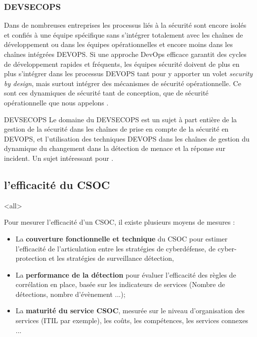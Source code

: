 

\subsubsection{DEVSECOPS}

Dans de nombreuses entreprises les processus liés à la sécurité sont encore isolés et confiés à une équipe spécifique sans s'intégrer totalement avec les chaînes de développement ou dans les équipes opérationnelles et encore moins dans les chaînes intégrées DEVOPS. 
 Si une approche DevOps efficace garantit des cycles de développement rapides et fréquents, les équipes sécurité doivent de plus en plus s'intégrer dans les processus DEVOPS tant pour y apporter un volet \textit{security by design}, mais surtout intégrer des mécanismes de sécurité opérationnelle.
 Ce sont ces dynamiques de sécurité tant de conception, que de sécurité opérationnelle que nous appelons .
 
\utocomplete

 
\begin{techworkbox}{DEVSECOPS}
Le domaine du DEVSECOPS est un sujet à part entière de la gestion de la sécurité dans les chaînes de prise en compte de la sécurité  en DEVOPS, et l'utilisation des techniques DEVOPS dans les chaînes de gestion du dynamique du changement dans la détection de menace et la réponse sur incident. Un sujet intéressant pour \fichetech.
\end{techworkbox}
 
 \subsection{l'efficacité du CSOC}
 
\mode<all>{
 {
 Pour mesurer l’efficacité d'un CSOC, il existe plusieurs moyens de mesures  :
 \begin{itemize}

  \item La \textbf{couverture fonctionnelle et technique }du CSOC pour estimer l'efficacité  de l'articulation entre les stratégies de cyberdéfense, de cyber-protection et les stratégies de surveillance détection, 
  \item La \textbf{performance de la détection } pour évaluer l’efficacité des règles de corrélation en place, basée sur les indicateurs de services (Nombre de détections, nombre d'évènement ...);
  \item La \textbf{maturité du service CSOC}, mesurée sur le niveau d'organisation des services (ITIL par exemple), les coûts, les compétences, les services connexes ...
\end{itemize}
}} %


